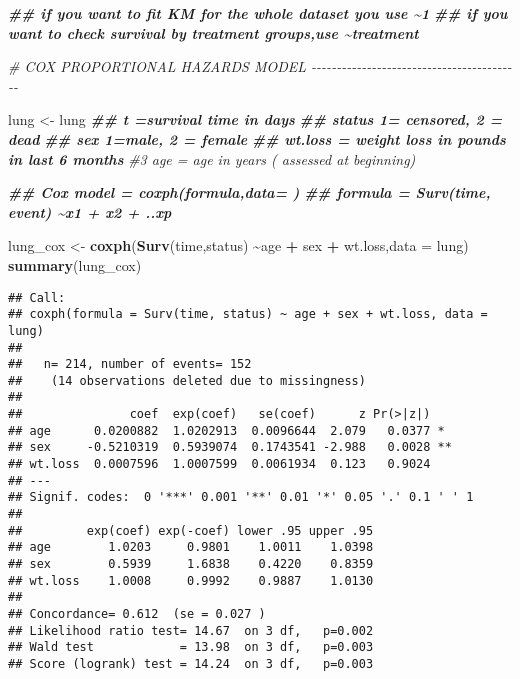 \documentclass[
]{article}
\newenvironment{Shaded}{\begin{snugshade}}{\end{snugshade}}
\newcommand{\AttributeTok}[1]{\textcolor[rgb]{0.13,0.29,0.53}{#1}}
\newcommand{\CommentTok}[1]{\textcolor[rgb]{0.56,0.35,0.01}{\textit{#1}}}
\newcommand{\DocumentationTok}[1]{\textcolor[rgb]{0.56,0.35,0.01}{\textbf{\textit{#1}}}}
\newcommand{\FunctionTok}[1]{\textcolor[rgb]{0.13,0.29,0.53}{\textbf{#1}}}
\newcommand{\NormalTok}[1]{#1}
\newcommand{\OtherTok}[1]{\textcolor[rgb]{0.56,0.35,0.01}{#1}}
\newcommand{\SpecialCharTok}[1]{\textcolor[rgb]{0.81,0.36,0.00}{\textbf{#1}}}
\begin{document}
\begin{Shaded}
\begin{Highlighting}[]
\DocumentationTok{\#\# if you want to fit KM for the whole dataset you use \textasciitilde{}1 }
\DocumentationTok{\#\# if you want to check survival by treatment groups,use \textasciitilde{}treatment}




\CommentTok{\# COX PROPORTIONAL HAZARDS MODEL {-}{-}{-}{-}{-}{-}{-}{-}{-}{-}{-}{-}{-}{-}{-}{-}{-}{-}{-}{-}{-}{-}{-}{-}{-}{-}{-}{-}{-}{-}{-}{-}{-}{-}{-}{-}{-}{-}{-}{-}{-}{-}}

\NormalTok{lung }\OtherTok{\textless{}{-}}\NormalTok{ lung}
\DocumentationTok{\#\# t =survival time in days}
\DocumentationTok{\#\# status 1= censored, 2 = dead}
\DocumentationTok{\#\# sex 1=male, 2 = female}
\DocumentationTok{\#\# wt.loss = weight loss in pounds in last 6 months}
\CommentTok{\#3 age = age in years ( assessed at beginning)}

\DocumentationTok{\#\# Cox model = coxph(formula,data= )}
\DocumentationTok{\#\# formula = Surv(time, event) \textasciitilde{}x1 + x2 + ..xp}

\NormalTok{lung\_cox }\OtherTok{\textless{}{-}} \FunctionTok{coxph}\NormalTok{(}\FunctionTok{Surv}\NormalTok{(time,status) }\SpecialCharTok{\textasciitilde{}}\NormalTok{age }\SpecialCharTok{+}\NormalTok{ sex }\SpecialCharTok{+}\NormalTok{ wt.loss,}\AttributeTok{data =}\NormalTok{ lung)}
\FunctionTok{summary}\NormalTok{(lung\_cox)}
\end{Highlighting}
\end{Shaded}

\begin{verbatim}
## Call:
## coxph(formula = Surv(time, status) ~ age + sex + wt.loss, data = lung)
## 
##   n= 214, number of events= 152 
##    (14 observations deleted due to missingness)
## 
##               coef  exp(coef)   se(coef)      z Pr(>|z|)   
## age      0.0200882  1.0202913  0.0096644  2.079   0.0377 * 
## sex     -0.5210319  0.5939074  0.1743541 -2.988   0.0028 **
## wt.loss  0.0007596  1.0007599  0.0061934  0.123   0.9024   
## ---
## Signif. codes:  0 '***' 0.001 '**' 0.01 '*' 0.05 '.' 0.1 ' ' 1
## 
##         exp(coef) exp(-coef) lower .95 upper .95
## age        1.0203     0.9801    1.0011    1.0398
## sex        0.5939     1.6838    0.4220    0.8359
## wt.loss    1.0008     0.9992    0.9887    1.0130
## 
## Concordance= 0.612  (se = 0.027 )
## Likelihood ratio test= 14.67  on 3 df,   p=0.002
## Wald test            = 13.98  on 3 df,   p=0.003
## Score (logrank) test = 14.24  on 3 df,   p=0.003
\end{verbatim}
\end{document}
